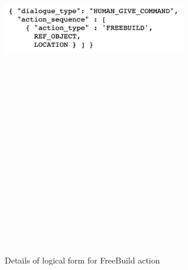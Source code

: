 \begin{figure}[h]
    \centering
    \includegraphics[width=8cm,height=20cm,keepaspectratio]{figures/freebuild.png}
    \caption{Details of logical form for FreeBuild action}
    \label{fig:freebuild_dict}
\end{figure}

